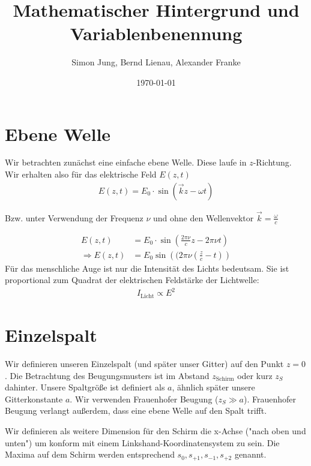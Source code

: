 \documentclass[a4paper]{article}
\title{Mathematischer Hintergrund und Variablenbenennung}
\author{Simon Jung, Bernd Lienau, Alexander Franke}
\date{\today}
\begin{document}
\maketitle

\section{Ebene Welle}
Wir betrachten zunächst eine einfache ebene Welle. Diese laufe in $z$-Richtung. Wir erhalten also für das elektrische Feld $E(z,t)$
\begin{align}
E(z,t) = E_0 \cdot \sin(\vec{k}z-\omega t)
\end{align}

Bzw. unter Verwendung der Frequenz $\nu$ und ohne den Wellenvektor $\vec{k} = \frac{\omega}{c}$

\begin{align}
E(z,t) &= E_0 \cdot \sin (\frac{2\pi\nu}{c} z - 2\pi\nu t ) \\
\Rightarrow E(z,t) &= E_0 \sin\left((2\pi\nu \left(\frac{z}{c} - t\right)\right)
\end{align}
 Für das menschliche Auge ist nur die Intensität des Lichts bedeutsam. Sie ist proportional zum Quadrat der
elektrischen Feldstärke der Lichtwelle: 
\begin{align}
I_\text{Licht} \propto E^2 
\end{align}
\section{Einzelspalt}
Wir definieren unseren Einzelspalt (und später unser Gitter) auf den Punkt $z=0$. Die Betrachtung des Beugungsmusters ist im Abstand $z_\text{Schirm}$ oder kurz $z_S$ dahinter. 
Unsere Spaltgröße ist definiert als $a$, ähnlich später unsere Gitterkonstante $a$. Wir verwenden Frauenhofer Beugung ($z_S \gg a$). Frauenhofer Beugung verlangt außerdem, dass eine ebene Welle auf den Spalt trifft.

Wir definieren als weitere Dimension für den Schirm die x-Achse ("nach oben und unten")  um konform mit einem Linkshand-Koordinatensystem zu sein. Die Maxima auf dem Schirm werden entsprechend $s_0, s_{+1}, s_{-1}, s_{+2}$ genannt.
\end{document}
